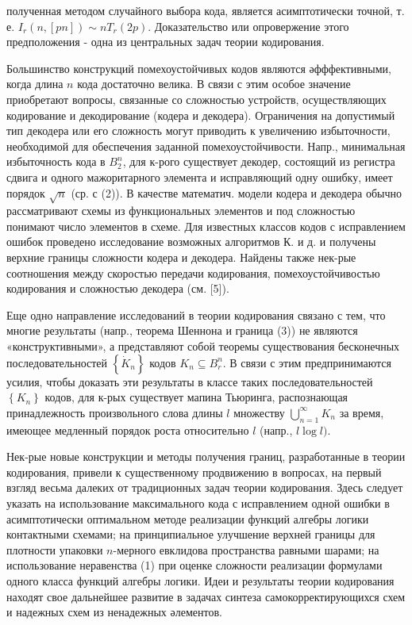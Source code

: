 \documentclass[10pt]{article}
\begin{document}
полученная методом случайного выбора кода, является асимптотически точной, т. е. $I_{r}(n,[p n]) \sim n T_{r}(2 p)$. Доказательство или опровержение этого предположения - одна из центральных задач теории кодирования.



Большинство конструкций помехоустойчивых кодов являются әфффективными, когда длина $n$ кода достаточно велика. В связи с этим особое значение приобретают вопросы, связанные со сложностью устройств, осуществляющих кодирование и декодирование (кодера и декодера). Ограничения на допустимый тип декодера или его сложность могут приводить к увеличению избыточности, необходимой для обеспечения заданной помехоустойчивости. Напр., минимальная избыточность кода в $B_{2}^{n}$, для к-рого существует декодер, состоящий из регистра сдвига и одного мажоритарного элемента и исправляющий одну ошибку, имеет порядок $\sqrt{n}$ (ср. с (2)). В качестве математич. модели кодера и декодера обычно рассматривают схемы из функциональных элементов и под сложностью понимают число элементов в схеме. Для известных классов кодов с исправлением ошибок проведено исследование возможных алгоритмов К. и д. и получены верхние границы сложности кодера и декодера. Найдены также нек-рые соотношения между скоростью передачи кодирования, помехоустойчивостью кодирования и сложностью декодера (см. [5]).



Еще одно направление исследований в теории кодирования связано с тем, что многие результаты (напр., теорема Шеннона и граница (3)) не являются «конструктивными», а представляют собой теоремы существования бесконечных последовательностей $\left\{\dot{K}_{n}\right\}$ кодов $K_{n} \subseteq B_{r}^{n}$. В связи с этим предпринимаются усилия, чтобы доказать эти результаты в классе таких последовательностей $\left\{K_{n}\right\}$ кодов, для к-рых существует мапина Тьюринга, распознающая принадлежность произвольного слова длины $l$ множеству $\bigcup_{n=1}^{\infty} K_{n}$ за время, имеющее медленный порядок роста относительно $l$ (напр., $l \log l)$.



Нек-рые новые конструкции и методы получения границ, разработанные в теории кодирования, привели к существенному продвижению в вопросах, на первый взгляд весьма далеких от традиционных задач теории кодирования. Здесь следует указать на использование максимального кода с исправлением одной ошибки в асимптотически оптимальном методе реализации функций алгебры логики контактными схемами; на принципиальное улучшение верхней границы для плотности упаковки $n$-мерного евклидова пространства равными шарами; на использование неравенства (1) при оценке сложности реализации формулами одного класса функций алгебры логики. Идеи и результаты теории кодирования находят свое дальнейшее развитие в задачах синтеза самокорректирующихся схем и надежных схем из ненадежных әлементов.
\end{document}
